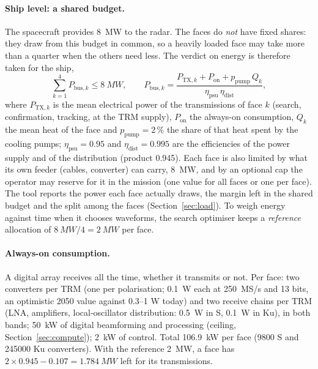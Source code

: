 \documentclass[11pt,a4paper]{article}
\begin{document}
\paragraph{Ship level: a shared budget.} The spacecraft provides \SI{8}{MW} to the radar. The faces do \emph{not} have
fixed shares: they draw from this budget in common, so a heavily loaded face may take more than a quarter when the
others need less. The verdict on energy is therefore taken for the ship,
\[
  \sum_{k=1}^{4} P_{\mathrm{bus},k} \le \SI{8}{MW},\qquad
  P_{\mathrm{bus},k} = \frac{P_{\mathrm{TX},k} + P_{\mathrm{on}} + p_{\mathrm{pump}}\,Q_k}{\eta_{\mathrm{psu}}\,\eta_{\mathrm{dist}}},
\]
where $P_{\mathrm{TX},k}$ is the mean electrical power of the transmissions of face $k$ (search, confirmation,
tracking, at the TRM supply), $P_{\mathrm{on}}$ the always-on consumption, $Q_k$ the mean heat of the face and
$p_{\mathrm{pump}} = 2\,\%$ the share of that heat spent by the cooling pumps; $\eta_{\mathrm{psu}} = 0.95$ and
$\eta_{\mathrm{dist}} = 0.995$ are the efficiencies of the power supply and of the distribution (product 0.945). Each
face is also limited by what its own feeder (cables, converter) can carry, \SI{8}{MW}, and by an optional cap the
operator may reserve for it in the mission (one value for all faces or one per face). The tool reports the power each
face actually draws, the margin left in the shared budget and the split among the faces (Section~\ref{sec:load}). To
weigh energy against time when it chooses waveforms, the search optimiser keeps a \emph{reference} allocation of
$\SI{8}{MW}/4 = \SI{2}{MW}$ per face.

\paragraph{Always-on consumption.} A digital array receives all the time, whether it transmits or not. Per face:
two converters per TRM (one per polarisation; \SI{0.1}{W} each at \SI{250}{MS/s} and 13 bits, an optimistic 2050 value
against 0.3--1 W today) and two receive chains per TRM (LNA, amplifiers, local-oscillator distribution: \SI{0.5}{W}
in S, \SI{0.1}{W} in Ku), in both bands; \SI{50}{kW} of digital beamforming and processing (ceiling,
Section~\ref{sec:compute}); \SI{2}{kW} of control. Total \SI{106.9}{kW} per face (\num{9800} S and \num{245000} Ku converters).
With the reference \SI{2}{MW}, a face has $2\times0.945 - 0.107 = \SI{1.784}{MW}$ left for its transmissions.
\end{document}
